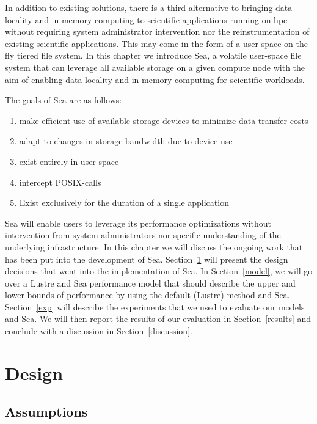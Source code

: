\documentclass{report}
\begin{document}
    In addition to existing solutions, there is a third alternative to bringing data
    locality and in-memory computing to scientific applications running on \gls{hpc}
    without requiring system administrator intervention nor the reinstrumentation
    of existing scientific applications. This may come in the form of a user-space 
    on-the-fly tiered file system. In this chapter we introduce Sea, a volatile user-space file
    system that can leverage all available storage on a given compute node with the aim
    of enabling data locality and in-memory computing for scientific workloads.

    The goals of Sea are as follows:
    \begin{enumerate}
            \item make efficient use of available storage devices to minimize data
                transfer costs
            \item adapt to changes in storage bandwidth due to device use
            \item exist entirely in user space
            \item intercept POSIX-calls
            \item Exist exclusively for the duration of a single application
    \end{enumerate}

   Sea will enable users to leverage its performance optimizations without intervention
   from system administrators nor specific understanding of the underlying infrastructure.
   In this chapter we will discuss the ongoing work that has been put into the development
   of Sea. Section~\ref{design} will present the design decisions that went into the
   implementation of Sea. In Section~\ref{model}, we will go over a Lustre and Sea
   performance model that should describe the upper and lower bounds of performance by using
   the default (Lustre) method and Sea. Section~\ref{exp} will describe the experiments that we
   used to evaluate our models and Sea. We will then report the results of our evaluation
   in Section~\ref{results} and conclude with a discussion in Section~\ref{discussion}.
    
   \section{Design}\label{design}
    \subsection{Assumptions}
\end{document}

